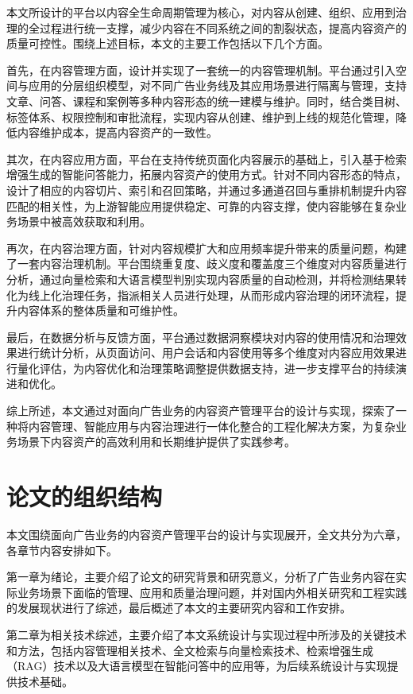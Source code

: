 本文所设计的平台以内容全生命周期管理为核心，对内容从创建、组织、应用到治理的全过程进行统一支撑，减少内容在不同系统之间的割裂状态，提高内容资产的质量可控性。围绕上述目标，本文的主要工作包括以下几个方面。

首先，在内容管理方面，设计并实现了一套统一的内容管理机制。平台通过引入空间与应用的分层组织模型，对不同广告业务线及其应用场景进行隔离与管理，支持文章、问答、课程和案例等多种内容形态的统一建模与维护。同时，结合类目树、标签体系、权限控制和审批流程，实现内容从创建、维护到上线的规范化管理，降低内容维护成本，提高内容资产的一致性。

其次，在内容应用方面，平台在支持传统页面化内容展示的基础上，引入基于检索增强生成的智能问答能力，拓展内容资产的使用方式。针对不同内容形态的特点，设计了相应的内容切片、索引和召回策略，并通过多通道召回与重排机制提升内容匹配的相关性，为上游智能应用提供稳定、可靠的内容支撑，使内容能够在复杂业务场景中被高效获取和利用。

再次，在内容治理方面，针对内容规模扩大和应用频率提升带来的质量问题，构建了一套内容治理机制。平台围绕重复度、歧义度和覆盖度三个维度对内容质量进行分析，通过向量检索和大语言模型判别实现内容质量的自动检测，并将检测结果转化为线上化治理任务，指派相关人员进行处理，从而形成内容治理的闭环流程，提升内容体系的整体质量和可维护性。

最后，在数据分析与反馈方面，平台通过数据洞察模块对内容的使用情况和治理效果进行统计分析，从页面访问、用户会话和内容使用等多个维度对内容应用效果进行量化评估，为内容优化和治理策略调整提供数据支持，进一步支撑平台的持续演进和优化。

综上所述，本文通过对面向广告业务的内容资产管理平台的设计与实现，探索了一种将内容管理、智能应用与内容治理进行一体化整合的工程化解决方案，为复杂业务场景下内容资产的高效利用和长期维护提供了实践参考。

\section{论文的组织结构}

本文围绕面向广告业务的内容资产管理平台的设计与实现展开，全文共分为六章，各章节内容安排如下。

第一章为绪论，主要介绍了论文的研究背景和研究意义，分析了广告业务内容在实际业务场景下面临的管理、应用和质量治理问题，并对国内外相关研究和工程实践的发展现状进行了综述，最后概述了本文的主要研究内容和工作安排。

第二章为相关技术综述，主要介绍了本文系统设计与实现过程中所涉及的关键技术和方法，包括内容管理相关技术、全文检索与向量检索技术、检索增强生成（RAG）技术以及大语言模型在智能问答中的应用等，为后续系统设计与实现提供技术基础。

